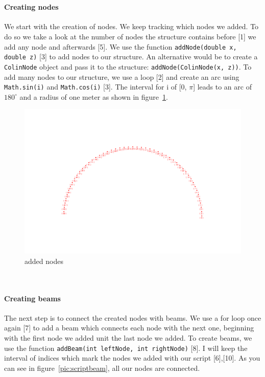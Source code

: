 \vspace{20pt}\\
\begin{minipage}[h]{\textwidth-8cm}
\paragraph{Creating nodes}
We start with the creation of nodes. We keep tracking which nodes we added. To do so we take a look at the number of nodes the structure contains before [1] we add any node and afterwards [5]. We use the function \texttt{addNode(double x, double z)} [3] to add nodes to our structure. An alternative would be to create a \texttt{ColinNode} object and pass it to the structure: \texttt{addNode(ColinNode(x, z))}. To add many nodes to our structure, we use a loop [2] and create an arc using \texttt{Math.sin(i)} and \texttt{Math.cos(i)} [3]. The interval for i of [0, $\pi$] leads to an arc of $180^\circ$ and a radius of one meter as shown in figure~\ref{pic:scriptnode}.
\end{minipage}
\hfill
\begin{minipage}[h]{8cm}
\begin{figure}[H]
\begin{center}
\includegraphics[width=\textwidth]{../pictures/scriptnode.png}
\caption{added nodes}
\label{pic:scriptnode}
\end{center}
\end{figure}
\end{minipage}
\vspace{20pt}\\
\begin{minipage}[h]{\textwidth-8cm}
\paragraph{Creating beams} The next step is to connect the created nodes with beams. We use a for loop once again [7] to add a beam which connects each node with the next one, beginning with the first node we added unit the last node we added. To create beams, we use the function \texttt{addBeam(int leftNode, int rightNode)} [8]. I will keep the interval of indices which mark the nodes we added with our script [6],[10]. As you can see in figure~\ref{pic:scriptbeam}, all our nodes are connected.
\end{minipage}

